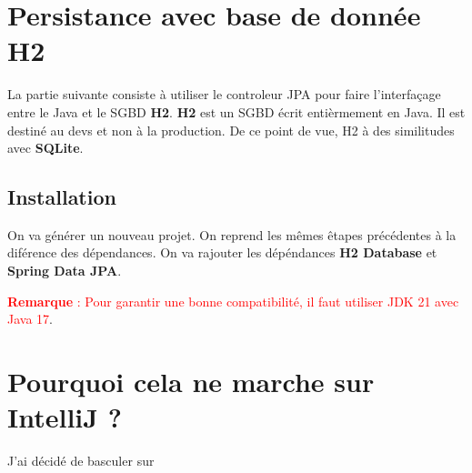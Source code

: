 \documentclass{rapport}
\begin{document}
\section{Persistance avec base de donnée H2}

La partie suivante consiste à utiliser le controleur JPA pour faire l'interfaçage entre le Java et le SGBD \textbf{H2}. \textbf{H2} est un SGBD écrit entièrmement en Java. Il est destiné au devs et non à la production. De ce point de vue, H2 à des similitudes avec \textbf{SQLite}.

\subsection{Installation}

On va générer un nouveau projet. On reprend les mêmes êtapes précédentes à la diférence des dépendances. On va rajouter les dépéndances \textbf{H2 Database} et \textbf{Spring Data JPA}.

\textcolor{red}{\textbf{Remarque} : Pour garantir une bonne compatibilité, il faut utiliser JDK 21 avec Java 17}.



\section{Pourquoi cela ne marche sur IntelliJ ?}

J'ai décidé de basculer sur 
\end{document}
